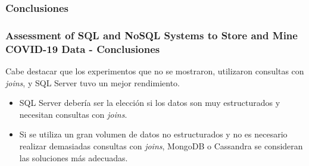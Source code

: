 \subsubsection{Conclusiones}

\begin{frame}
    \frametitle{Assessment of SQL and NoSQL Systems to Store and Mine COVID-19 Data - Conclusiones}

    Cabe destacar que los experimentos que no se mostraron, utilizaron consultas con \textit{joins}, y SQL Server tuvo un mejor rendimiento.

     

    \begin{itemize}
        \item SQL Server debería ser la elección si los datos son muy estructurados y necesitan consultas con \textit{joins}.

         
    
        \item Si se utiliza un gran volumen de datos no estructurados y no es necesario realizar demasiadas consultas con \textit{joins}, MongoDB o Cassandra se consideran las soluciones más adecuadas.
    \end{itemize}
\end{frame}